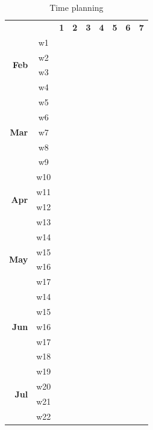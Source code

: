\renewcommand{\arraystretch}{0.9}
\begin{table}[h]
    \begin{center}
        \begin{tabular}{ r c c c c c c c c }
        && \textbf{1} & \textbf{2} & \textbf{3} & \textbf{4} & \textbf{5} & \textbf{6} & \textbf{7} \\ 
        \multirow{4}{*}{\textbf{Feb}} & w1 & \cellcolor{yellow!70!lime} \\ & w2 & \cellcolor{yellow!70!lime} \\ & w3 && \cellcolor{yellow!60!lime} \\ & w4 && \cellcolor{yellow!60!lime} \\ 
        \multirow{5}{*}{\textbf{Mar}} & w5 && \cellcolor{yellow!60!lime} \\ & w6 &&& \cellcolor{yellow!50!lime} \\ & w7 &&& \cellcolor{yellow!50!lime} \\ & w8 &&& \cellcolor{yellow!50!lime} \\ & w9 &&& \cellcolor{yellow!50!lime} \\ 
        \multirow{4}{*}{\textbf{Apr}} & w10 &&&& \cellcolor{yellow!40!lime} \\ & w11 &&&& \cellcolor{yellow!40!lime} \\ & w12 &&&& \cellcolor{yellow!40!lime} \\ & w13 &&&& \cellcolor{yellow!40!lime} \\ 
        \multirow{4}{*}{\textbf{May}} & w14 &&&&& \cellcolor{yellow!30!lime} \\ & w15 &&&&& \cellcolor{yellow!30!lime} \\ & w16 &&&&& \cellcolor{yellow!30!lime} \\ & w17 &&&&& \cellcolor{yellow!30!lime} \\ 
        \multirow{5}{*}{\textbf{Jun}} & w14 &&&&& \cellcolor{yellow!30!lime} \\ & w15 &&&&& \cellcolor{yellow!30!lime} \\ & w16 &&&&&& \cellcolor{yellow!20!lime} \\ & w17 &&&&&& \cellcolor{yellow!20!lime} \\ & w18 &&&&&& \cellcolor{yellow!20!lime} \\ 
        \multirow{4}{*}{\textbf{Jul}} & w19 &&&&&& \cellcolor{yellow!20!lime} \\ & w20 &&&&&&& \cellcolor{yellow!10!lime} \\ & w21 &&&&&&& \cellcolor{white} \\ & w22 &&&&&&& \cellcolor{white} \\ 
        \end{tabular}
    \end{center}
    \caption{Time planning}
    \label{tab:planning}
\end{table}